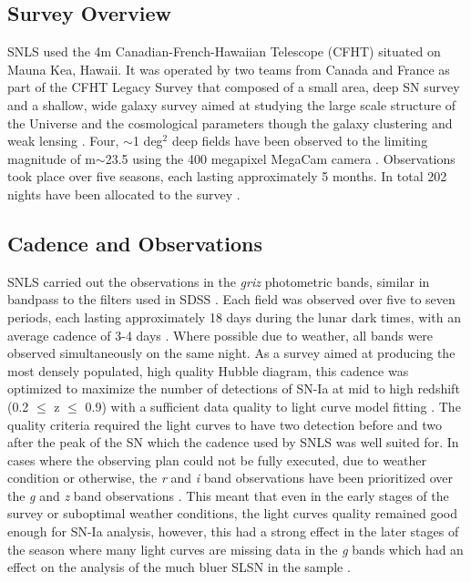 \subsection{Survey Overview}
SNLS used the 4m Canadian-French-Hawaiian Telescope (CFHT) situated on Mauna Kea, Hawaii. It was operated by two teams from Canada and France as part of the CFHT Legacy Survey that composed of a small area, deep SN survey and a shallow, wide galaxy survey aimed at studying the large scale structure of the Universe and the cosmological parameters though the galaxy clustering and weak lensing \citep{Pritchet2004,Astier2006}. Four, $\sim$1 deg$^2$ deep fields have been observed to the limiting magnitude of m$\sim$23.5 using the 400 megapixel MegaCam camera \citep{Boulade2003}. Observations took place over five seasons, each lasting approximately 5 months. In total 202 nights have been allocated to the survey \citep{Pritchet2004}.

\subsection{Cadence and Observations}
SNLS carried out the observations in the \textit{griz} photometric bands, similar in bandpass to the filters used in SDSS . Each field was observed over five to seven periods, each lasting approximately 18 days during the lunar dark times, with an average cadence of 3-4 days \citep{Astier2006,Guy2010}. Where possible due to weather, all bands were observed simultaneously on the same night. As a survey aimed at producing the most densely populated, high quality Hubble diagram, this cadence was optimized to maximize the number of detections of SN-Ia at mid to high redshift (0.2 $\leq$ z $\leq$ 0.9) with a sufficient data quality to light curve model fitting \citep{Pritchet2004}. The quality criteria required the light curves to have two detection before and two after the peak of the SN which the cadence used by SNLS was well suited for. In cases where the observing plan could not be fully executed, due to weather condition or otherwise, the \textit{r} and \textit{i} band observations have been prioritized over the \textit{g} and \textit{z} band observations \citep{Guy2010}. This meant that even in the early stages of the survey or suboptimal weather conditions, the light curves quality remained good enough for SN-Ia analysis, however, this had a strong effect in the later stages of the season where many light curves are missing data in the \textit{g} bands which had an effect on the analysis of the much bluer SLSN in the sample \citep{Prajs2016}.  

